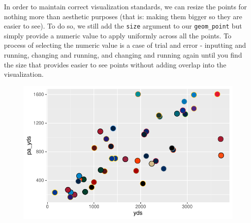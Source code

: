 \documentclass[
  letterpaper,
]{krantz}
\newenvironment{Shaded}{\begin{snugshade}}{\end{snugshade}}
\newcommand{\AttributeTok}[1]{\textcolor[rgb]{0.40,0.45,0.13}{#1}}
\newcommand{\DecValTok}[1]{\textcolor[rgb]{0.68,0.00,0.00}{#1}}
\newcommand{\FloatTok}[1]{\textcolor[rgb]{0.68,0.00,0.00}{#1}}
\newcommand{\FunctionTok}[1]{\textcolor[rgb]{0.28,0.35,0.67}{#1}}
\newcommand{\NormalTok}[1]{\textcolor[rgb]{0.00,0.23,0.31}{#1}}
\newcommand{\SpecialCharTok}[1]{\textcolor[rgb]{0.37,0.37,0.37}{#1}}
\begin{document}
In order to maintain correct visualization standards, we can resize the
points for nothing more than aesthetic purposes (that is: making them
bigger so they are easier to see). To do so, we still add the
\texttt{size} argument to our \texttt{geom\_point} but simply provide a
numeric value to apply uniformly across all the points. To process of
selecting the numeric value is a case of trial and error - inputting and
running, changing and running, and changing and running again until you
find the size that provides easier to see points without adding overlap
into the visualization.

\begin{Shaded}
\end{Shaded}

\begin{figure}[H]

{\centering \includegraphics{04-nfl-analytics-visualization_files/figure-pdf/adding-correct-size-to-points-1.pdf}

}

\end{figure}
\end{document}
